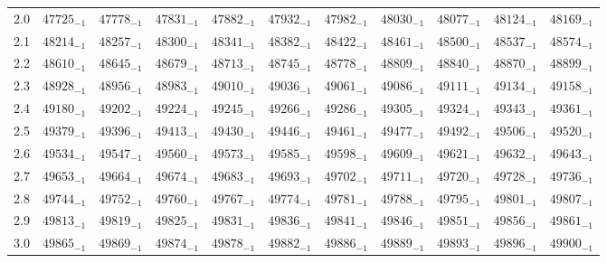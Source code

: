 \documentclass[10pt, a4paper]{article}
\begin{document}
\begin{center}
\begin{longtable}{c || c c c c c | c c c c c}
        2.0 & \({47725}_{-1}\) & \({47778}_{-1}\) & \({47831}_{-1}\) & \({47882}_{-1}\) & \({47932}_{-1}\) & \({47982}_{-1}\) & \({48030}_{-1}\) & \({48077}_{-1}\) & \({48124}_{-1}\) & \({48169}_{-1}\)\\
        2.1 & \({48214}_{-1}\) & \({48257}_{-1}\) & \({48300}_{-1}\) & \({48341}_{-1}\) & \({48382}_{-1}\) & \({48422}_{-1}\) & \({48461}_{-1}\) & \({48500}_{-1}\) & \({48537}_{-1}\) & \({48574}_{-1}\)\\
        2.2 & \({48610}_{-1}\) & \({48645}_{-1}\) & \({48679}_{-1}\) & \({48713}_{-1}\) & \({48745}_{-1}\) & \({48778}_{-1}\) & \({48809}_{-1}\) & \({48840}_{-1}\) & \({48870}_{-1}\) & \({48899}_{-1}\)\\
        2.3 & \({48928}_{-1}\) & \({48956}_{-1}\) & \({48983}_{-1}\) & \({49010}_{-1}\) & \({49036}_{-1}\) & \({49061}_{-1}\) & \({49086}_{-1}\) & \({49111}_{-1}\) & \({49134}_{-1}\) & \({49158}_{-1}\)\\
        2.4 & \({49180}_{-1}\) & \({49202}_{-1}\) & \({49224}_{-1}\) & \({49245}_{-1}\) & \({49266}_{-1}\) & \({49286}_{-1}\) & \({49305}_{-1}\) & \({49324}_{-1}\) & \({49343}_{-1}\) & \({49361}_{-1}\)\\
        2.5 & \({49379}_{-1}\) & \({49396}_{-1}\) & \({49413}_{-1}\) & \({49430}_{-1}\) & \({49446}_{-1}\) & \({49461}_{-1}\) & \({49477}_{-1}\) & \({49492}_{-1}\) & \({49506}_{-1}\) & \({49520}_{-1}\)\\
        2.6 & \({49534}_{-1}\) & \({49547}_{-1}\) & \({49560}_{-1}\) & \({49573}_{-1}\) & \({49585}_{-1}\) & \({49598}_{-1}\) & \({49609}_{-1}\) & \({49621}_{-1}\) & \({49632}_{-1}\) & \({49643}_{-1}\)\\
        2.7 & \({49653}_{-1}\) & \({49664}_{-1}\) & \({49674}_{-1}\) & \({49683}_{-1}\) & \({49693}_{-1}\) & \({49702}_{-1}\) & \({49711}_{-1}\) & \({49720}_{-1}\) & \({49728}_{-1}\) & \({49736}_{-1}\)\\
        2.8 & \({49744}_{-1}\) & \({49752}_{-1}\) & \({49760}_{-1}\) & \({49767}_{-1}\) & \({49774}_{-1}\) & \({49781}_{-1}\) & \({49788}_{-1}\) & \({49795}_{-1}\) & \({49801}_{-1}\) & \({49807}_{-1}\)\\
        2.9 & \({49813}_{-1}\) & \({49819}_{-1}\) & \({49825}_{-1}\) & \({49831}_{-1}\) & \({49836}_{-1}\) & \({49841}_{-1}\) & \({49846}_{-1}\) & \({49851}_{-1}\) & \({49856}_{-1}\) & \({49861}_{-1}\)\\
        3.0 & \({49865}_{-1}\) & \({49869}_{-1}\) & \({49874}_{-1}\) & \({49878}_{-1}\) & \({49882}_{-1}\) & \({49886}_{-1}\) & \({49889}_{-1}\) & \({49893}_{-1}\) & \({49896}_{-1}\) & \({49900}_{-1}\)\\

\end{longtable}
\end{center}
\end{document}
